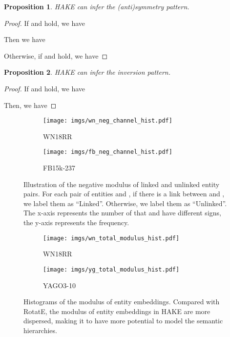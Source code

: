 \documentclass[letterpaper]{article} \usepackage{aaai20}  \usepackage{times}  \usepackage{helvet} \usepackage{courier}  \usepackage[hyphens]{url}  \usepackage{graphicx} \urlstyle{rm} \def\UrlFont{\rm}  \usepackage{graphicx}  \frenchspacing  \setlength{\pdfpagewidth}{8.5in}  \setlength{\pdfpageheight}{11in}
\newtheorem{prop}{Proposition}
\begin{document}
\begin{prop}
    HAKE can infer the (anti)symmetry pattern.
\end{prop}

\begin{proof}
    If  and  hold, we have
    
    Then we have
    

    Otherwise, if  and  hold, we have
    
\end{proof}

\begin{prop}
    HAKE can infer the inversion pattern.
\end{prop}

\begin{proof}
    If  and  hold, we have
    
    
    Then, we have
    
\end{proof}

\begin{figure}[!h]
  \centering \begin{subfigure}[b]{0.2\textwidth}
  \texttt{[image: imgs/wn\_neg\_channel\_hist.pdf]}
  \caption{WN18RR}
  \end{subfigure}
  \begin{subfigure}[b]{0.2\textwidth}
  \texttt{[image: imgs/fb\_neg\_channel\_hist.pdf]}
  \caption{FB15k-237}
  \end{subfigure}
\caption{Illustration of the negative modulus of linked and unlinked entity pairs. For each pair of entities  and , if there is a link between  and , we label them as ``Linked''. Otherwise, we label them as ``Unlinked''. The x-axis represents the number of  that  and  have different signs, the y-axis represents the frequency.}
\label{fig:neg_channel_illustration}
\end{figure}

\vspace{5mm}
\begin{figure}[!h]
  \centering \begin{subfigure}[b]{0.2\textwidth}
  \texttt{[image: imgs/wn\_total\_modulus\_hist.pdf]}
  \caption{WN18RR}
  \end{subfigure}
  \begin{subfigure}[b]{0.2\textwidth}
  \texttt{[image: imgs/yg\_total\_modulus\_hist.pdf]}
  \caption{YAGO3-10}
  \end{subfigure}
\caption{Histograms of the modulus of entity embeddings. Compared with RotatE, the modulus of entity embeddings in HAKE are more dispersed, making it to have more potential to model the semantic hierarchies.}
\label{fig:total_modulus_hist}
\end{figure}
\end{document}
